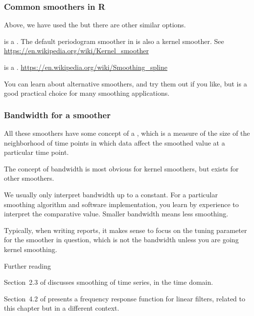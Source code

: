 \begin{frame}[fragile]

\frametitle{Common smoothers in R}

\bi

\item Above, we have used the   but there are other similar options.

\item {} is a . The default periodogram smoother in  is also a kernel smoother. See \url{https://en.wikipedia.org/wiki/Kernel_smoother}

\item {} is a .
\url{https://en.wikipedia.org/wiki/Smoothing_spline}

\item You can learn about alternative smoothers, and try them out if you like, but  is a good practical choice for many smoothing applications.

\ei
\end{frame}

\begin{frame}[fragile]
\frametitle{Bandwidth for a smoother}
\bi
\item All these smoothers have some concept of a , which is a measure of the size of the neighborhood of time points in which data affect the smoothed value at a particular time point. 

\item The concept of bandwidth is most obvious for kernel smoothers, but exists for other smoothers.

\item We usually only interpret bandwidth up to a constant. For a particular smoothing algorithm and software implementation, you learn by experience to interpret the comparative value. Smaller bandwidth means less smoothing. 

\item Typically, when writing reports, it makes sense to focus on the tuning parameter for the smoother in question, which is not the bandwidth unless you are going kernel smoothing.

\ei
\end{frame}

\begin{frame}{Further reading} 

\bi

\item Section~2.3 of \citet{shumway17} discusses smoothing of time series, in the time domain.

\item Section~4.2 of \citet{shumway17} presents a frequency response function for linear filters, related to this chapter but in a different context.

\ei


\end{frame}


